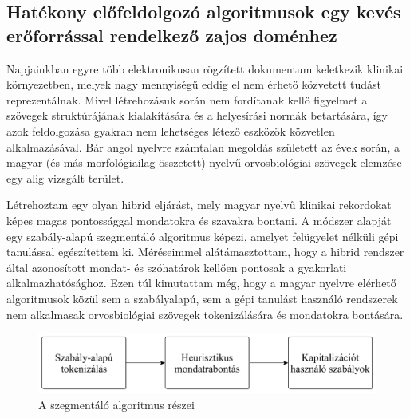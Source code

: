 \subsection{Hatékony előfeldolgozó algoritmusok egy kevés erőforrással rendelkező zajos doménhez}
\label{thes:clin}

Napjainkban egyre több elektronikusan rögzített dokumentum keletkezik klinikai környezetben, melyek nagy mennyiségű eddig el nem érhető közvetett tudást reprezentálnak. 
Mivel létrehozásuk során nem fordítanak kellő figyelmet a szövegek struktúrájának kialakítására és a helyesírási normák betartására, így azok feldolgozása gyakran nem lehetséges létező eszközök közvetlen alkalmazásával. 
Bár angol nyelvre számtalan megoldás született az évek során, a magyar (és más morfológiailag összetett) nyelvű orvosbiológiai szövegek elemzése egy alig vizsgált terület.

% 
% 



\begin{core}
\begin{thesis}%
\label{thes:clin-segment}
Létrehoztam egy olyan hibrid eljárást, mely magyar nyelvű klinikai rekordokat képes magas pontossággal mondatokra és szavakra bontani. 
A módszer alapját egy szabály-alapú szegmentáló algoritmus képezi, amelyet felügyelet nélküli gépi tanulással egészítettem ki. %
Méréseimmel alátámasztottam, hogy a hibrid rendszer által azonosított mondat- és szóhatárok kellően pontosak a gyakorlati alkalmazhatósághoz.
Ezen túl kimutattam még, hogy a magyar nyelvre elérhető algoritmusok közül sem a szabályalapú, sem a gépi tanulást használó rendszerek nem alkalmasak orvosbiológiai szövegek tokenizálására és mondatokra bontására.
\end{thesis}

\begin{pub}
\cite{Orosz2013d, Orosz2014a}
\end{pub}
\end{core}


\begin{figure}[H] %
  \centering
  \includegraphics[scale=0.16]{Clinical/clin_segm_arch_hu.png} 
  \caption{A szegmentáló algoritmus részei}
  \label{fig:clin-segment-arch_en}
\end{figure}


